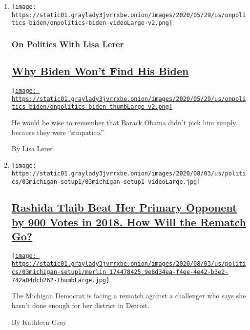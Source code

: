 \begin{enumerate}
\def\labelenumi{\arabic{enumi}.}
\item
  \texttt{[image: https://static01.graylady3jvrrxbe.onion/images/2020/05/29/us/onpolitics-biden/onpolitics-biden-videoLarge-v2.png]}

  \hypertarget{on-politics-with-lisa-lerer}{%
  \subsubsection{On Politics With Lisa
  Lerer}\label{on-politics-with-lisa-lerer}}

  \hypertarget{why-biden-wont-find-his-biden}{%
  \subsection{\texorpdfstring{\href{/2020/08/03/us/politics/joe-biden-vp.html}{Why
  Biden Won't Find His
  Biden}}{Why Biden Won't Find His Biden}}\label{why-biden-wont-find-his-biden}}

  \href{/2020/08/03/us/politics/joe-biden-vp.html}{\texttt{[image: https://static01.graylady3jvrrxbe.onion/images/2020/05/29/us/onpolitics-biden/onpolitics-biden-thumbLarge-v2.png]}}

  He would be wise to remember that Barack Obama didn't pick him simply
  because they were ``simpatico.''

  By Lisa Lerer
\item
  \texttt{[image: https://static01.graylady3jvrrxbe.onion/images/2020/08/03/us/politics/03michigan-setup1/03michigan-setup1-videoLarge.jpg]}

  \hypertarget{rashida-tlaib-beat-her-primary-opponent-by-900-votes-in-2018-how-will-the-rematch-go}{%
  \subsection{\texorpdfstring{\href{/2020/08/03/us/politics/michigan-primary-rashida-tlaib-brenda-jones.html}{Rashida
  Tlaib Beat Her Primary Opponent by 900 Votes in 2018. How Will the
  Rematch
  Go?}}{Rashida Tlaib Beat Her Primary Opponent by 900 Votes in 2018. How Will the Rematch Go?}}\label{rashida-tlaib-beat-her-primary-opponent-by-900-votes-in-2018-how-will-the-rematch-go}}

  \href{/2020/08/03/us/politics/michigan-primary-rashida-tlaib-brenda-jones.html}{\texttt{[image: https://static01.graylady3jvrrxbe.onion/images/2020/08/03/us/politics/03michigan-setup1/merlin\_174478425\_9e8d34ea-f4ee-4e42-b3e2-742a04dcb262-thumbLarge.jpg]}}

  The Michigan Democrat is facing a rematch against a challenger who
  says she hasn't done enough for her district in Detroit.

  By Kathleen Gray
\end{enumerate}

